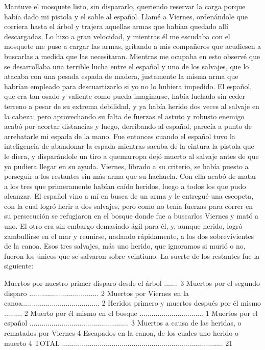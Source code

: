 \documentclass{novela}
\begin{document}
    Mantuve el mosquete listo, sin dispararlo, queriendo reservar la carga porque había dado mi pistola y el sable al español. Llamé a Viernes, ordenándole que corriera hasta el árbol y trajera aquellas armas que habían quedado allí descargadas. Lo hizo a gran velocidad, y mientras él me escudaba con el mosquete me puse a cargar las armas, gritando a mis compañeros que acudiesen a buscarlas a medida que las necesitaran. Mientras me ocupaba en esto observé que se desarrollaba una terrible lucha entre el español y uno de los salvajes, que lo atacaba con una pesada espada de madera, justamente la misma arma que habrían empleado para descuartizarlo si yo no lo hubiera impedido. El español, que era tan osado y valiente como pueda imaginarse, había luchado sin ceder terreno a pesar de su extrema debilidad, y ya había herido dos veces al salvaje en la cabeza; pero aprovechando su falta de fuerzas el astuto y robusto enemigo acabó por acortar distancias y luego, derribando al español, parecía a punto de arrebatarle mi espada de la mano. Fue entonces cuando el español tuvo la inteligencia de abandonar la espada mientras sacaba de la cintura la pistola que le diera, y disparándole un tiro a quemarropa dejó muerto al salvaje antes de que yo pudiera llegar en su ayuda.
    Viernes, librado a su criterio, se había puesto a perseguir a los restantes sin más arma que su hachuela. Con ella acabó de matar a los tres que primeramente habían caído heridos, luego a todos los que pudo alcanzar. El español vino a mí en busca de un arma y le entregué una escopeta, con la cual logró herir a dos salvajes, pero como no tenía fuerzas para correr en su persecución se refugiaron en el bosque donde fue a buscarlos Viernes y mató a uno. El otro era sin embargo demasiado ágil para él, y, aunque herido, logró zambullirse en el mar y reunirse, nadando rápidamente, a los dos sobrevivientes de la canoa. Esos tres salvajes, más uno herido, que ignoramos si murió o no, fueron los únicos que se salvaron sobre veintiuno. La suerte de los restantes fue la siguiente:


Muertos por nuestro primer disparo desde el árbol   .......     3 Muertos por el segundo disparo    ...................................     2 Muertos por Viernes en la canoa.......................................     2 Heridos primero y muertos después por él mismo   .........      2 Muerto por él mismo en el bosque   ................................     1 Muertos por el español   ..................................................     3 Muertos a  causa de las heridas, o rematados por Viernes     4 Escapados en la canoa, de los cuales uno herido o muerto          4 TOTAL   .................................................................................   21
\end{document}
